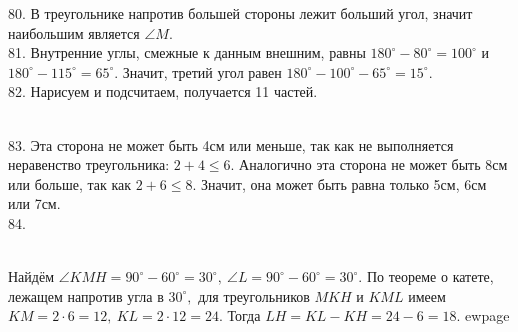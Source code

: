 80. В треугольнике напротив большей стороны лежит больший угол, значит наибольшим является $\angle M.$\\
81. Внутренние углы, смежные к данным внешним, равны $180^\circ-80^\circ=100^\circ$ и $180^\circ-115^\circ=65^\circ.$ Значит, третий угол равен $180^\circ-100^\circ-65^\circ=15^\circ.$\\
82. Нарисуем и подсчитаем, получается 11 частей.
\begin{figure}[ht!]
\end{figure}\\
83. Эта сторона не может быть 4см или меньше, так как не выполняется неравенство треугольника: $2+4\leqslant6.$ Аналогично эта сторона не может быть 8см или больше, так как $2+6\leqslant8.$ Значит, она может быть равна только 5см, 6см или 7см.\\
84. \begin{figure}[ht!]
\end{figure}\\
Найдём $\angle KMH=90^\circ-60^\circ=30^\circ,\ \angle L=90^\circ-60^\circ=30^\circ.$ По теореме о катете, лежащем напротив угла в $30^\circ,$ для треугольников $MKH$ и $KML$ имеем $KM=2\cdot6=12,\ KL=2\cdot12=24.$ Тогда $LH=KL-KH=24-6=18.$
ewpage

